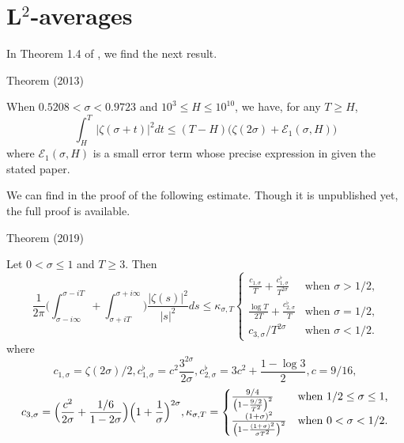 \par 
\section{L${}^2$-averages}


In Theorem 1.4 of
\cite{Kadiri*13},
we find the next result.
\begin{thm}{Theorem (2013)}

    When $0.5208 < \sigma < 0.9723$ and $10^3\le H \le 10^{10}$,
    we have, for any $T\ge H$,
    $$
			    \int_H^T |\zeta(\sigma + t)|^2 dt
			    \le
			    (T-H) \bigl(\zeta(2\sigma) +
    \mathcal{E}_1(\sigma, H)\bigr)
			    $$
    where $\mathcal{E}_1(\sigma, H)$ is a small error term whose
    precise expression in given the stated paper.
\end{thm}


We can find in
\cite{Helgott*17u} the proof
of the following estimate. Though it is unpublished yet, the full proof
is available.
\begin{thm}{Theorem (2019)}

Let $0 < \sigma\le1$ and $T \ge 3$. Then
  $$
    \frac{1}{2\pi}\biggl(
    \int_{\sigma-i\infty}^{\sigma-iT}
    +
    \int^{\sigma+i\infty}_{\sigma+iT}
    \biggr)
    \frac{|\zeta(s)|^2}{|s|^2}ds\le
    \kappa_{\sigma,T}
    \begin{cases}
    \frac{c_{1,\sigma}}{T}+\frac{c^\flat_{1,\sigma}}{T^{2\sigma}}
    &\text{when $\sigma > 1/2$,}\\
    \frac{\log T}{2T}+\frac{c^\flat_{2,\sigma}}{T}
    &\text{when $\sigma=1/2$,}\\
    c_{3,\sigma}/T^{2\sigma}&\text{when $\sigma < 1/2$.}
    \end{cases}
  $$
 where
$$
c_{1,\sigma}=\zeta(2\sigma)/2,
 c_{1,\sigma}^\flat=c^2 \frac{3^{2\sigma}}{2\sigma},
  c_{2,\sigma}^\flat=3c^2+\frac{1-\log 3}{2},
c=9/16,						  
 $$
 $$
 c_{3,\sigma}=
\Bigl(\frac{c^2}{2\sigma}+\frac{1/6}{1-2\sigma}\Bigr)
\Bigl(1+\frac{1}{\sigma}\Bigr)^{2\sigma},
\kappa_{\sigma,T}=
\begin{cases}
\frac{9/4}{\left(1-\frac{9/2}{T^2}\right)^2}
&\text{when $1/2\le \sigma\le 1$,}\\
\frac{(1+\sigma)^2}{\left(1-\frac{(1+\sigma)^2}{\sigma T^2}\right)^2}
&\text{when $0 < \sigma < 1/2$.}
 \end{cases}
 $$
						  
\end{thm}





